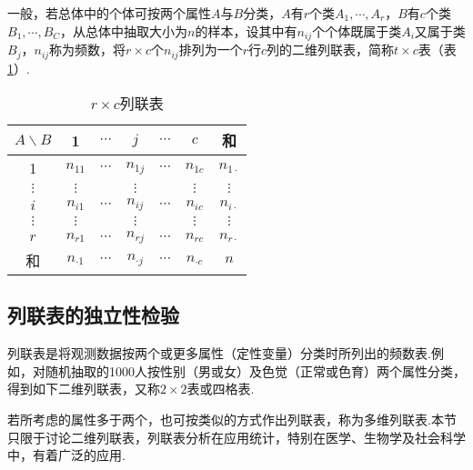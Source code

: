 一般，若总体中的个体可按两个属性$A$与$B$分类，$A$有$r$个类$A_1,\cdots,A_r$，$B$有$c$个类$B_1,\cdots,B_C$，从总体中抽取大小为$n$的样本，设其中有$n_{ij}$个个体既属于类$A_i$又属于类$B_j$，$n_{ij}$称为频数，将$r\times c$个$n_{ij}$排列为一个$r$行$c$列的二维列联表，简称$t\times c$表（表 \ref{tab7.4.3}）.
\begin{table}[!ht]
  \centering
  \caption{$r\times c$列联表}\label{tab7.4.3}
  \begin{tabular}{c|*{5}{c}|c}
    \toprule
    $A\backslash B$ & 1 & $\cdots$ & $j$ & $\cdots$ & $c$ & 和 \\
    \midrule
    1 & $n_{11}$ & $\cdots$ & $n_{1j}$ & $\cdots$ & $n_{1c}$ & $n_{1\cdot}$  \\
    $\vdots$ & $\vdots$ & & $\vdots$ & & $\vdots$ & $\vdots$ \\
    $i$ & $n_{i1}$ & $\cdots$ & $n_{ij}$ & $\cdots$ & $n_{ic}$ & $n_{i\cdot}$ \\
    $\vdots$ & $\vdots$ & & $\vdots$ & & $\vdots$ & $\vdots$ \\
    $r$ & $n_{r1}$ & $\cdots$ & $n_{rj}$ & $\cdots$ & $n_{rc}$ & $n_{r\cdot}$ \\
    \midrule
    和 & $n_{\cdot1}$ & $\cdots$ & $n_{\cdot j}$ & $\cdots$ & $n_{\cdot c}$ & $n$ \\
    \bottomrule
  \end{tabular}
\end{table}

\subsection{列联表的独立性检验\label{sec:7.3.2}}
列联表是将观测数据按两个或更多属性（定性变量）分类时所列出的频数表.例如，对随机抽取的1000人按性别（男或女）及色觉（正常或色育）两个属性分类，得到如下二维列联表，又称$2\times2$表或四格表.

若所考虑的属性多于两个，也可按类似的方式作出列联表，称为多维列联表.本节只限于讨论二维列联表，列联表分析在应用统计，特别在医学、生物学及社会科学中，有着广泛的应用.

